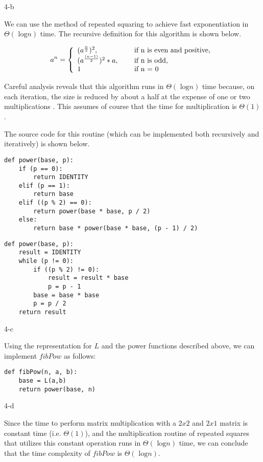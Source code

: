 \documentclass[11pt]{article}
\newcommand{\tlog}{\text{ log}}
\begin{document}
\begin{prob}{4-b}
\end{prob}
\begin{sol}

We can use the method of repeated squaring to achieve fast exponentiation in $\Theta(\tlog n)$ time. The recursive definition for this algorithm is shown below.

\[
a^{n} = \left\{ 
  \begin{array}{l l}
    (a^{\frac{n}{2}})^{2}, & \quad \text{ if n is even and positive,} \\
    (a^{\frac{(n-1)}{2}})^{2} * a, & \quad \text{ if n is odd}, \\
   1 & \quad \text{ if n = 0}
  \end{array} \right.
\]

Careful analysis reveals that this algorithm runs in $\Theta(\tlog n)$ time because, on each iteration, the size is reduced by about a half at the expense of one or two multiplications \cite{AlgoBook}. This assumes of course that the time for multiplication is $\Theta(1)$.

The source code for this routine (which can be implemented both recursively and iteratively) is shown below.
\begin{lstlisting}
def power(base, p):
	if (p == 0):
		return IDENTITY
	elif (p == 1):
		return base
	elif ((p % 2) == 0):
		return power(base * base, p / 2)
	else:
		return base * power(base * base, (p - 1) / 2)
\end{lstlisting}

\begin{lstlisting}
def power(base, p):
	result = IDENTITY
	while (p != 0):
		if ((p % 2) != 0):
			result = result * base
			p = p - 1
		base = base * base
		p = p / 2
	return result
\end{lstlisting}
\end{sol}

\begin{prob}{4-c}
\end{prob}
\begin{sol}

Using the representation for $L$ and the power functions described above, we can implement $fibPow$ as follows:
\begin{lstlisting}
def fibPow(n, a, b):
	base = L(a,b)
	return power(base, n)
\end{lstlisting}
\end{sol}

\begin{prob}{4-d}
\end{prob}
\begin{sol}

Since the time to perform matrix multiplication with a $2x2$ and $2x1$ matrix is constant time (i.e. $\Theta(1)$), and the multiplication routine of repeated squares that utilizes this constant operation runs in $\Theta(\tlog n)$ time, we can conclude that the time complexity of $fibPow$ is $\Theta(\tlog n)$.
\end{sol}
\end{document}
